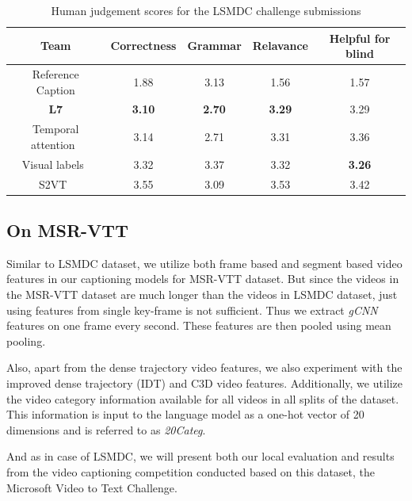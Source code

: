 \begin{table}[th]
  \centering
  \newcommand{\bs}{\small\bf}
  \begin{adjustbox}{center}
  \begin{tabular}{||c|c|c|c|c|}
    \hline\hline
    \bf Team  &\bs Correctness &\bs Grammar &\bs Relavance & \bf Helpful for blind\\\hline\hline
    Reference Caption    & 1.88  & 3.13  & 1.56  & 1.57\\\hline
    \bf L7               &\bf3.10&\bf2.70&\bf3.29&3.29\\
    Temporal attention~\cite{yao2015describing} & 3.14  & 2.71  & 3.31  & 3.36\\
    Visual labels~\cite{rohrbach2015long}& 3.32  & 3.37  & 3.32  &\bf3.26\\
    S2VT~\cite{venugopalan2015sequence}& 3.55  & 3.09  & 3.53  & 3.42\\
    \hline
  \end{tabular}
  \end{adjustbox}
  \caption{Human judgement scores for the LSMDC challenge submissions}
  \label{tab:resLsmdcTestHum}
\end{table}

\subsection{On MSR-VTT}
Similar to LSMDC dataset, we utilize both frame based and segment based video
features in our captioning models for MSR-VTT dataset.
But since the videos in the MSR-VTT dataset are much longer than the videos in
LSMDC dataset, just using features from single key-frame is not sufficient.
Thus we extract \emph{gCNN} features on one frame every second.
These features are then pooled using mean pooling.

Also, apart from the dense trajectory video features, we also experiment with
the improved dense trajectory (IDT) and C3D video features. 
Additionally, we utilize the video category information available for all videos
in all splits of the dataset.
This information is input to the language model as a one-hot vector of 20
dimensions and is referred to as \emph{20Categ}.

And as in case of LSMDC, we will present both our local evaluation and results
from the video captioning competition conducted based on this dataset, the
Microsoft Video to Text Challenge.

